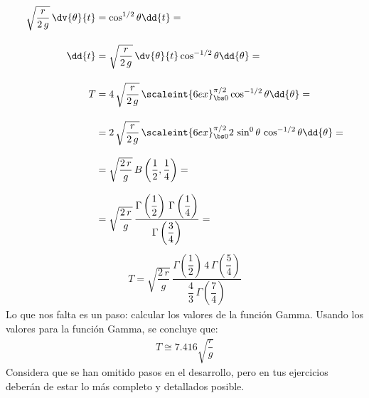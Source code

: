 \begin{align*}
\sqrt{\dfrac{r}{2 \, g}} \, \dv{\theta}{t} &= \cos^{1/2} \theta \dd{t} = \\[1em]
\dd{t} &= \sqrt{\dfrac{r}{2 \, g}} \, \dv{\theta}{t} \cos^{-1/2} \theta \dd{\theta} = \\[1em]
T &= 4 \, \sqrt{\dfrac{r}{2 \, g}} \, \scaleint{6ex}_{\bs 0}^{\pi/2} \cos^{-1/2} \theta \dd{\theta} = \\[1em]
&= 2 \, \sqrt{\dfrac{r}{2 \, g}} \, \scaleint{6ex}_{\bs 0}^{\pi/2} 2 \, \sin^{0} \theta \, \cos^{-1/2} \theta \dd{\theta} = \\[0.8em]
&= \sqrt{\dfrac{2 \, r}{g}} \, B \left( \dfrac{1}{2}, \dfrac{1}{4} \right) = \\[0.8em]
&= \sqrt{\dfrac{2 \, r}{g}} \, \dfrac{\Gamma \left(\dfrac{1}{2} \right) \, \Gamma \left(\dfrac{1}{4} \right)}{\Gamma \left(\dfrac{3}{4} \right)} = 
\end{align*}
\endgroup
\begin{align*}
T = \sqrt{\dfrac{2 \, r}{g}} \, \dfrac{\Gamma \left(\dfrac{1}{2} \right) \, 4 \, \Gamma \left(\dfrac{5}{4} \right)}{\dfrac{4}{3} \, \Gamma \left(\dfrac{7}{4} \right)}
\end{align*}
Lo que nos falta es un paso: calcular los valores de la función Gamma. Usando los valores para la función Gamma, se concluye que:
\begin{align*}
T \cong 7.416 \sqrt{\dfrac{r}{g}}
\end{align*}
Considera que se han omitido pasos en el desarrollo, pero en tus ejercicios deberán de estar lo más completo y detallados posible.